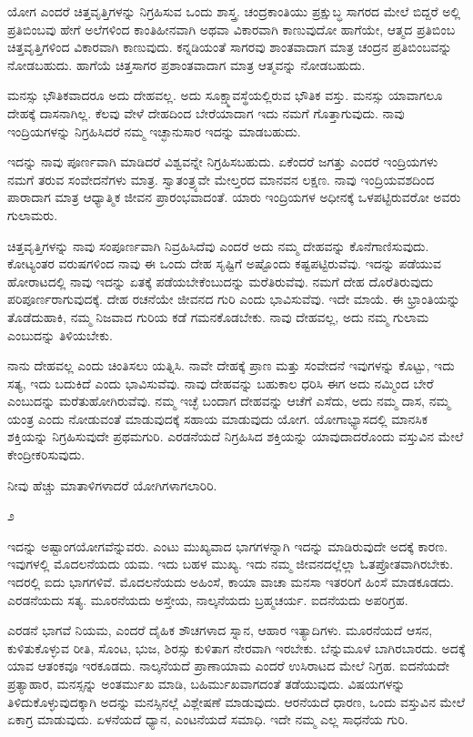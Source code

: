ಯೋಗ ಎಂದರೆ ಚಿತ್ತವೃತ್ತಿಗಳನ್ನು ನಿಗ್ರಹಿಸುವ ಒಂದು ಶಾಸ್ತ್ರ. ಚಂದ್ರಕಾಂತಿಯು ಪ್ರಕ್ಷುಬ್ಧ ಸಾಗರದ ಮೇಲೆ ಬಿದ್ದರೆ ಅಲ್ಲಿ ಪ್ರತಿಬಿಂಬವು ಹೇಗೆ ಅಲೆಗಳಿಂದ ಕಾಂತಿಹೀನವಾಗಿ ಅಥವಾ ವಿಕಾರವಾಗಿ ಕಾಣುವುದೋ ಹಾಗೆಯೇ, ಆತ್ಮದ ಪ್ರತಿಬಿಂಬ ಚಿತ್ತವೃತ್ತಿಗಳಿಂದ ವಿಕಾರವಾಗಿ ಕಾಣುವುದು. ಕನ್ನಡಿಯಂತೆ ಸಾಗರವು ಶಾಂತವಾದಾಗ ಮಾತ್ರ ಚಂದ್ರನ ಪ್ರತಿಬಿಂಬವನ್ನು ನೋಡಬಹುದು. ಹಾಗೆಯೆ ಚಿತ್ತಸಾಗರ ಪ್ರಶಾಂತವಾದಾಗ ಮಾತ್ರ ಆತ್ಮವನ್ನು ನೋಡಬಹುದು.

\newpage

ಮನಸ್ಸು ಭೌತಿಕವಾದರೂ ಅದು ದೇಹವಲ್ಲ. ಅದು ಸೂಕ್ಷ್ಮಾವಸ್ಥೆಯಲ್ಲಿರುವ ಭೌತಿಕ ವಸ್ತು. ಮನಸ್ಸು ಯಾವಾಗಲೂ ದೇಹಕ್ಕೆ ದಾಸನಾಗಿಲ್ಲ. ಕೆಲವು ವೇಳೆ ದೇಹದಿಂದ ಬೇರೆಯಾದಾಗ ಇದು ನಮಗೆ ಗೊತ್ತಾಗುವುದು. ನಾವು ಇಂದ್ರಿಯಗಳನ್ನು ನಿಗ್ರಹಿಸಿದರೆ ನಮ್ಮ ಇಚ್ಛಾನುಸಾರ ಇದನ್ನು ಮಾಡಬಹುದು.

ಇದನ್ನು ನಾವು ಪೂರ್ಣವಾಗಿ ಮಾಡಿದರೆ ವಿಶ್ವವನ್ನೇ ನಿಗ್ರಹಿಸಬಹುದು. ಏಕೆಂದರೆ ಜಗತ್ತು ಎಂದರೆ ಇಂದ್ರಿಯಗಳು ನಮಗೆ ತರುವ ಸಂವೇದನೆಗಳು ಮಾತ್ರ. ಸ್ವಾತಂತ್ರ್ಯವೇ ಮೇಲ್ತರದ ಮಾನವನ ಲಕ್ಷಣ. ನಾವು ಇಂದ್ರಿಯವಶದಿಂದ ಪಾರಾದಾಗ ಮಾತ್ರ ಆಧ್ಯಾತ್ಮಿಕ ಜೀವನ ಪ್ರಾರಂಭವಾದಂತೆ. ಯಾರು ಇಂದ್ರಿಯಗಳ ಅಧೀನಕ್ಕೆ ಒಳಪಟ್ಟಿರುವರೋ ಅವರು ಗುಲಾಮರು.

ಚಿತ್ತವೃತ್ತಿಗಳನ್ನು ನಾವು ಸಂಪೂರ್ಣವಾಗಿ ನಿವ್ರಹಿಸಿದೆವು ಎಂದರೆ ಅದು ನಮ್ಮ ದೇಹವನ್ನು ಕೊನೆಗಾಣಿಸುವುದು. ಕೋಟ್ಯಂತರ ವರುಷಗಳಿಂದ ನಾವು ಈ ಒಂದು ದೇಹ ಸೃಷ್ಟಿಗೆ ಅಷ್ಟೊಂದು ಕಷ್ಟಪಟ್ಟಿರುವೆವು. ಇದನ್ನು ಪಡೆಯುವ ಹೋರಾಟದಲ್ಲಿ ನಾವು ಇದನ್ನು ಏತಕ್ಕೆ ಪಡೆಯಬೇಕೆಂಬುದನ್ನು ಮರೆತಿರುವೆವು. ನಮಗೆ ದೇಹ ದೊರೆತಿರುವುದು ಪರಿಪೂರ್ಣರಾಗುವುದಕ್ಕೆ. ದೇಹ ರಚನೆಯೇ ಜೀವನದ ಗುರಿ ಎಂದು ಭಾವಿಸುವೆವು. ಇದೇ ಮಾಯೆ. ಈ ಭ್ರಾಂತಿಯನ್ನು ತೊಡೆದುಹಾಕಿ, ನಮ್ಮ ನಿಜವಾದ ಗುರಿಯ ಕಡೆ ಗಮನಕೊಡಬೇಕು. ನಾವು ದೇಹವಲ್ಲ, ಅದು ನಮ್ಮ ಗುಲಾಮ ಎಂಬುದನ್ನು ತಿಳಿಯಬೇಕು.

ನಾನು ದೇಹವಲ್ಲ ಎಂದು ಚಿಂತಿಸಲು ಯತ್ನಿಸಿ. ನಾವೇ ದೇಹಕ್ಕೆ ಪ್ರಾಣ ಮತ್ತು ಸಂವೇದನೆ ಇವುಗಳನ್ನು ಕೊಟ್ಟು, ಇದು ಸತ್ಯ, ಇದು ಬದುಕಿದೆ ಎಂದು ಭಾವಿಸುವೆವು. ನಾವು ದೇಹವನ್ನು ಬಹುಕಾಲ ಧರಿಸಿ ಈಗ ಅದು ನಮ್ಮಿಂದ ಬೇರೆ ಎಂಬುದನ್ನು ಮರೆತುಹೋಗಿರುವೆವು. ನಮ್ಮ ಇಚ್ಛೆ ಬಂದಾಗ ದೇಹವನ್ನು ಆಚೆಗೆ ಎಸೆದು, ಅದು ನಮ್ಮ ದಾಸ, ನಮ್ಮ ಯಂತ್ರ ಎಂದು ನೋಡುವಂತೆ ಮಾಡುವುದಕ್ಕೆ ಸಹಾಯ ಮಾಡುವುದು ಯೋಗ. ಯೋಗಾಭ್ಯಾಸದಲ್ಲಿ ಮಾನಸಿಕ ಶಕ್ತಿಯನ್ನು ನಿಗ್ರಹಿಸುವುದೇ ಪ್ರಥಮಗುರಿ. ಎರಡನೆಯದೆ ನಿಗ್ರಹಿಸಿದ ಶಕ್ತಿಯನ್ನು ಯಾವುದಾದರೊಂದು ವಸ್ತುವಿನ ಮೇಲೆ ಕೇಂದ್ರೀಕರಿಸುವುದು.

ನೀವು ಹೆಚ್ಚು ಮಾತಾಳಿಗಳಾದರೆ ಯೋಗಿಗಳಾಗಲಾರಿರಿ.

\begin{center}
೨
\end{center}

ಇದನ್ನು ಅಷ್ಟಾಂಗಯೋಗವೆನ್ನುವರು. ಎಂಟು ಮುಖ್ಯವಾದ ಭಾಗಗಳನ್ನಾಗಿ ಇದನ್ನು ಮಾಡಿರುವುದೇ ಅದಕ್ಕೆ ಕಾರಣ. ಇವುಗಳಲ್ಲಿ ಮೊದಲನೆಯದು ಯಮ. ಇದು ಬಹಳ ಮುಖ್ಯ. ಇದು ನಮ್ಮ ಜೀವನದಲ್ಲೆಲ್ಲಾ ಓತಪ್ರೋತವಾಗಿರಬೇಕು. ಇದರಲ್ಲಿ ಐದು ಭಾಗಗಳಿವೆ. ಮೊದಲನೆಯದು ಅಹಿಂಸೆ, ಕಾಯಾ ವಾಚಾ ಮನಸಾ ಇತರರಿಗೆ ಹಿಂಸೆ ಮಾಡಕೂಡದು. ಎರಡನೆಯದು ಸತ್ಯ. ಮೂರನೆಯದು ಅಸ್ತೇಯ, ನಾಲ್ಕನೆಯದು ಬ್ರಹ್ಮಚರ್ಯ. ಐದನೆಯದು ಅಪರಿಗ್ರಹ.

ಎರಡನೆ ಭಾಗವೆ ನಿಯಮ, ಎಂದರೆ ದೈಹಿಕ ಶೌಚಗಳಾದ ಸ್ನಾನ, ಆಹಾರ ಇತ್ಯಾದಿಗಳು. ಮೂರನೆಯದೆ ಆಸನ, ಕುಳಿತುಕೊಳ್ಳುವ ರೀತಿ, ಸೊಂಟ, ಭುಜ, ಶಿರಸ್ಸು ಕುಳಿತಾಗ ನೇರವಾಗಿ ಇರಬೇಕು. ಬೆನ್ನುಮೂಳೆ ಬಾಗಿರಬಾರದು. ಅದಕ್ಕೆ ಯಾವ ಆತಂಕವೂ ಇರಕೂಡದು. ನಾಲ್ಕನೆಯದೆ ಪ್ರಾಣಾಯಾಮ ಎಂದರೆ ಉಸಿರಾಟದ ಮೇಲೆ ನಿಗ್ರಹ. ಐದನೆಯದೇ ಪ್ರತ್ಯಾಹಾರ, ಮನಸ್ಸನ್ನು ಅಂತರ್ಮುಖ ಮಾಡಿ, ಬಹಿರ್ಮುಖವಾಗದಂತೆ ತಡೆಯುವುದು. ವಿಷಯಗಳನ್ನು ತಿಳಿದುಕೊಳ್ಳುವುದಕ್ಕಾಗಿ ಅದನ್ನು ಮನಸ್ಸಿನಲ್ಲೆ ವಿಶ್ಲೇಷಣೆ ಮಾಡುವುದು. ಆರನೆಯದೆ ಧಾರಣ, ಒಂದು ವಸ್ತುವಿನ ಮೇಲೆ ಏಕಾಗ್ರ ಮಾಡುವುದು. ಏಳನೆಯದೆ ಧ್ಯಾನ, ಎಂಟನೆಯದೆ ಸಮಾಧಿ. ಇದೇ ನಮ್ಮ ಎಲ್ಲ ಸಾಧನೆಯ ಗುರಿ.


